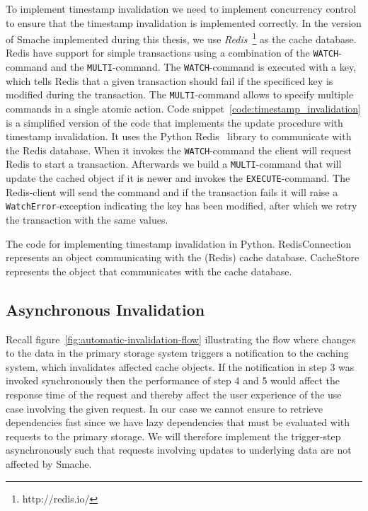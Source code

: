 To implement timestamp invalidation we need to implement concurrency control to ensure that the timestamp invalidation is implemented correctly. In the version of Smache implemented during this thesis, we use \emph{Redis}~\footnote{http://redis.io/} as the cache database. Redis have support for simple transactions using a combination of the \verb$WATCH$-command and the \verb$MULTI$-command. The \verb$WATCH$-command is executed with a key, which tells Redis that a given transaction should fail if the specificed key is modified during the transaction. The \verb$MULTI$-command allows to specify multiple commands in a single atomic action.
Code snippet~\ref{code:timestamp_invalidation} is a simplified version of the code that implements the update procedure with timestamp invalidation. It uses the Python Redis~\cite{docs:python-redis} library to communicate with the Redis database. When it invokes the \verb$WATCH$-command the client will request Redis to start a transaction. Afterwards we build a \verb$MULTI$-command that will update the cached object if it is newer and invokes the \verb$EXECUTE$-command. The Redis-client will send the command and if the transaction fails it will raise a \verb$WatchError$-exception indicating the key has been modified, after which we retry the transaction with the same values.

\begin{code}{The code for implementing timestamp invalidation in Python. RedisConnection represents an object communicating with the (Redis) cache database. CacheStore represents the object that communicates with the cache database.}
  
  \label{code:timestamp_invalidation}
\end{code}


\subsection{Asynchronous Invalidation}
\label{subsec:asynchronous-invalidation}

Recall figure~\ref{fig:automatic-invalidation-flow} illustrating the flow where changes to the data in the primary storage system triggers a notification to the caching system, which invalidates affected cache objects. If the notification in step 3 was invoked synchronously then the performance of step 4 and 5 would affect the response time of the request and thereby affect the user experience of the use case involving the given request. In our case we cannot ensure to retrieve dependencies fast since we have lazy dependencies that must be evaluated with requests to the primary storage. We will therefore implement the trigger-step asynchronously such that requests involving updates to underlying data are not affected by Smache.

